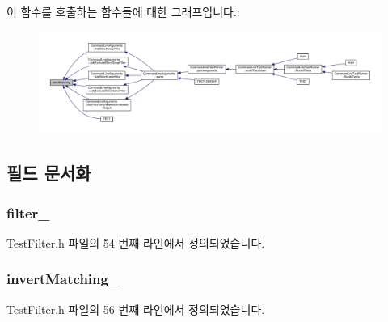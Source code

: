 이 함수를 호출하는 함수들에 대한 그래프입니다.\+:
\nopagebreak
\begin{figure}[H]
\begin{center}
\leavevmode
\includegraphics[width=350pt]{class_test_filter_a67e3ce804b0e3a08b8c7a4655e77e4ff_icgraph}
\end{center}
\end{figure}




\subsection{필드 문서화}
\subsubsection[{\texorpdfstring{filter\+\_\+}{filter_}}]{ filter\+\_\+\hspace{0.3cm}{\ttfamily [private]}}\hypertarget{class_test_filter_a8d65949e9f299bd1ffe5716a3b3b1d84}{}\label{class_test_filter_a8d65949e9f299bd1ffe5716a3b3b1d84}


Test\+Filter.\+h 파일의 54 번째 라인에서 정의되었습니다.

\subsubsection[{\texorpdfstring{invert\+Matching\+\_\+}{invertMatching_}}]{ invert\+Matching\+\_\+\hspace{0.3cm}{\ttfamily [private]}}\hypertarget{class_test_filter_afe5708fc4400cdc0dfdf287d1deb505a}{}\label{class_test_filter_afe5708fc4400cdc0dfdf287d1deb505a}


Test\+Filter.\+h 파일의 56 번째 라인에서 정의되었습니다.

